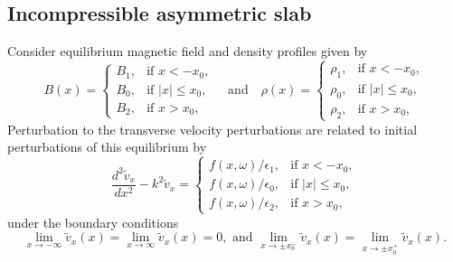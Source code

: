 \subsection{Incompressible asymmetric slab} \label{sec: incomp asym slab}

Consider equilibrium magnetic field and density profiles given by
\begin{equation}
B(x)=
\begin{cases}
B_1, & \text{if  }x<-x_0, \\
B_0, & \text{if }|x|\leq{x_0}, \\
B_2, & \text{if  }x>x_0,
\end{cases}
\quad \text{and} \quad
\rho(x)=
\begin{cases}
\rho_1, & \text{if  }x<-x_0, \\
\rho_0, & \text{if }|x|\leq{x_0}, \\
\rho_2, & \text{if  }x>x_0,
\end{cases}
\end{equation}
Perturbation to the transverse velocity perturbations are related to initial perturbations of this equilibrium by
\begin{equation}
\frac{d^2\tilde{v}_x}{dx^2} - k^2\tilde{v}_x = 
\begin{cases}
f(x, \omega)/\epsilon_1, & \text{if  } x < -x_0,\\
f(x, \omega)/\epsilon_0, & \text{if  } |x| \leq x_0,\\
f(x, \omega)/\epsilon_2, & \text{if  } x > x_0,
\end{cases}
\label{ivp gov slab 2}
\end{equation}
under the boundary conditions
\begin{equation}
\lim_{x \to -\infty}\tilde{v}_x(x) = \lim_{x \to \infty}\tilde{v}_x(x) = 0, \text{ and } \lim_{x \to \pm x_0^-}\tilde{v}_x(x) = \lim_{x \to \pm x_0^+}\tilde{v}_x(x).
\label{ivp slab BC}
\end{equation}

